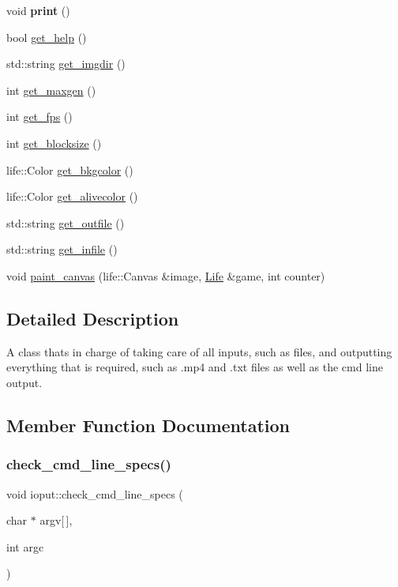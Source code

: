 \begin{DoxyCompactItemize}
void {\bfseries print} ()
\item 
bool \hyperlink{classioput_ad6cd7eba7190641dca05acdef9d4e959}{get\+\_\+help} ()
\item 
std\+::string \hyperlink{classioput_a25f843ebe6f2f29ca45470d4b02c1389}{get\+\_\+imgdir} ()
\item 
int \hyperlink{classioput_af5603ef96a4ae8db6f02d6d35227ac64}{get\+\_\+maxgen} ()
\item 
int \hyperlink{classioput_ad57f6282c14f07f221185e73d9d2889d}{get\+\_\+fps} ()
\item 
int \hyperlink{classioput_aae6979078f699f9b769297664ee26396}{get\+\_\+blocksize} ()
\item 
life\+::\+Color \hyperlink{classioput_a5c708adf775782056bac78f5a8596ace}{get\+\_\+bkgcolor} ()
\item 
life\+::\+Color \hyperlink{classioput_a11c07552398d47f872787e3f0a7aee40}{get\+\_\+alivecolor} ()
\item 
std\+::string \hyperlink{classioput_abdde82b7076a334519ada5f3a74d579a}{get\+\_\+outfile} ()
\item 
std\+::string \hyperlink{classioput_a7a165641e61846400db59840c5a6a160}{get\+\_\+infile} ()
\item 
void \hyperlink{classioput_a4433619447855826728a3dca5f94d2b3}{paint\+\_\+canvas} (life\+::\+Canvas \&image, \hyperlink{structLife}{Life} \&game, int counter)
\end{DoxyCompactItemize}


\subsection{Detailed Description}
A class that\textquotesingle{}s in charge of taking care of all inputs, such as files, and outputting everything that is required, such as .mp4 and .txt files as well as the cmd line output. 

\subsection{Member Function Documentation}
\mbox{\label{classioput_affa8f83e3d696f8b083d69c062f45bed}} 
\subsubsection{\texorpdfstring{check\+\_\+cmd\+\_\+line\+\_\+specs()}{check\_cmd\_line\_specs()}}
{\footnotesize\ttfamily void ioput\+::check\+\_\+cmd\+\_\+line\+\_\+specs (\begin{DoxyParamCaption}\item[{char $\ast$}]{argv\mbox{[}$\,$\mbox{]},  }\item[{int}]{argc }\end{DoxyParamCaption})}

